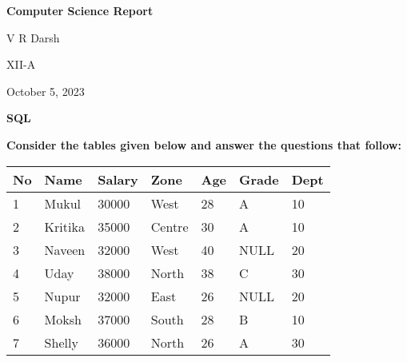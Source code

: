 \documentclass[
a4paper]{article}
\begin{document}
	\begin{titlepage}
		\hfill 
		
		\vspace{.2\textheight}
		
		\begin{center}
			{\LARGE\bfseries Computer Science Report\par}
			\vspace{3cm}
			\large V R Darsh \par
			XII-A \par
		\end{center}
		\vfill\centering October 5, 2023 \par
	\end{titlepage}
	
	
	\newpage
	\begin{large}
		\begin{center}
			\centering\LARGE\bfseries SQL
		\end{center}
		\vspace{1cm}
		{\bfseries Consider the tables given below and answer the questions that follow:}
		\vspace{0.5cm}\\
		\begin{center}
			\begin{tabular}{|l|l|l|l|l|l|l|}
				\hline
				\textbf{No} & \textbf{Name} & \textbf{Salary} & \textbf{Zone} & \textbf{Age} & \textbf{Grade} & \textbf{Dept} \\ \hline
				1           & Mukul         & 30000           & West          & 28           & A              & 10            \\ \hline
				2           & Kritika       & 35000           & Centre        & 30           & A              & 10            \\ \hline
				3           & Naveen        & 32000           & West          & 40           & NULL           & 20            \\ \hline
				4           & Uday          & 38000           & North         & 38           & C              & 30            \\ \hline
				5           & Nupur         & 32000           & East          & 26           & NULL           & 20            \\ \hline
				6           & Moksh         & 37000           & South         & 28           & B              & 10            \\ \hline
				7           & Shelly        & 36000           & North         & 26           & A              & 30            \\ \hline
			\end{tabular}
			\vspace{0.5cm}
			

\end{center}
\end{large}
\end{document}
